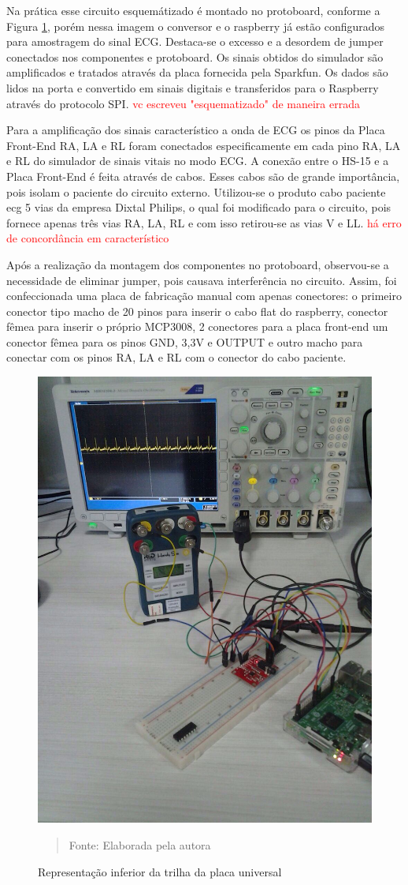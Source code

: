 \documentclass[12pt, a4paper]{article}
\begin{document}
Na prática esse circuito esquemátizado é montado no protoboard, conforme a Figura \ref{fig:esquem}, porém nessa imagem o conversor e o raspberry já estão configurados para amostragem do sinal ECG. Destaca-se o excesso e a desordem de jumper conectados nos componentes e protoboard. Os sinais obtidos do simulador são amplificados e tratados através da placa fornecida pela  Sparkfun. Os dados são lidos na porta e convertido em sinais digitais e transferidos para o Raspberry através do protocolo SPI. \textcolor{red}{vc escreveu "esquematizado" de maneira errada}

Para a amplificação dos sinais característico a onda de ECG os pinos da Placa Front-End RA, LA e RL foram conectados especificamente em cada pino RA, LA e RL do simulador de sinais vitais no modo ECG. A conexão entre o HS-15 e a Placa Front-End é feita através de cabos. Esses cabos são de grande importância, pois isolam o paciente do circuito externo. Utilizou-se o produto cabo paciente ecg 5 vias da empresa Dixtal Philips, o qual foi modificado para o circuito, pois fornece apenas três vias RA, LA, RL e com isso retirou-se as vias V e LL. \textcolor{red}{há erro de concordância em característico}

Após a realização da montagem dos componentes no protoboard, observou-se a necessidade de eliminar jumper, pois causava interferência no circuito. Assim, foi confeccionada uma placa de fabricação manual com apenas  conectores: o primeiro conector tipo macho de 20 pinos para inserir o cabo flat do raspberry, conector fêmea para inserir o próprio MCP3008, 2 conectores para a placa front-end um conector fêmea para os pinos GND, 3,3V e OUTPUT e outro macho para conectar com os pinos RA, LA e RL com o conector do cabo paciente.

\begin{figure}[H]
\begin{center}
			\caption{Representação inferior da trilha da placa universal}
			\includegraphics[width=.5\textwidth]{Figuras/pop.jpeg}
             \vspace*{\fill} 
            \begin{quote} 
            \centering 
           Fonte: Elaborada pela autora
            \end{quote}
            \vspace*{\fill}
			\label{fig:esquem}
\end{center}
\end{figure}
\end{document}
